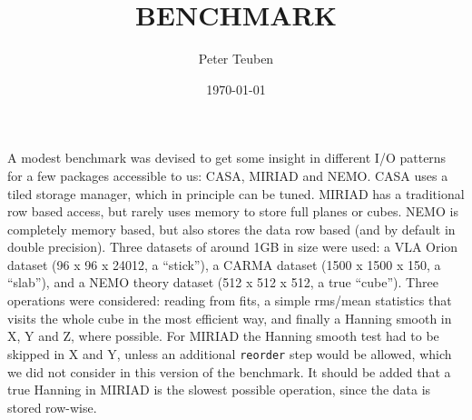 \documentclass{article}
\title{BENCHMARK}
\author{Peter Teuben}
\date{\today}
\begin{document}
\maketitle


A modest benchmark was devised to get some insight in different
I/O patterns for a few packages accessible to us: CASA,
MIRIAD and NEMO. CASA uses a tiled storage manager, which in principle
can be tuned. MIRIAD has a traditional row based access, but rarely
uses memory to store full planes or cubes. NEMO is completely
memory based, but also stores the data row based (and by default
in double precision).
Three datasets of around 1GB in size were used:
a VLA Orion dataset (96 x 96 x 24012, a ``stick''),
a CARMA dataset (1500 x 1500 x 150, a ``slab''), and a
NEMO theory dataset (512 x 512 x 512, a true ``cube'').
Three operations were considered:  reading from fits,
a simple rms/mean statistics that visits the whole cube in the
most efficient way, and finally
a Hanning smooth in X, Y and Z, where possible.  For MIRIAD
the Hanning smooth test had to be skipped in X and Y, unless
an additional {\tt reorder} step would be allowed, which we did
not consider in this version of the benchmark.
It should be added that a true Hanning in MIRIAD
is the slowest possible operation, since the data is stored
row-wise.
\end{document}
